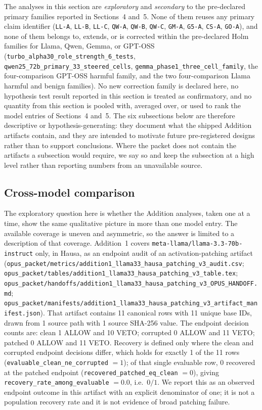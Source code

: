 The analyses in this section are \emph{exploratory} and \emph{secondary} to the
pre-declared primary families reported in Sections~4 and~5. None of them reuses
any primary claim identifier (\texttt{LL-A}, \texttt{LL-B}, \texttt{LL-C},
\texttt{QW-A}, \texttt{QW-B}, \texttt{QW-C}, \texttt{GM-A}, \texttt{G5-A},
\texttt{CS-A}, \texttt{GO-A}), and none of them belongs to, extends, or is
corrected within the pre-declared Holm families for Llama, Qwen, Gemma, or
GPT-OSS (\texttt{turbo\_alpha30\_role\_strength\_6\_tests},
\texttt{qwen25\_72b\_primary\_33\_steered\_cells},
\texttt{gemma\_phase1\_three\_cell\_family}, the four-comparison GPT-OSS harmful
family, and the two four-comparison Llama harmful and benign families). No new
correction family is declared here, no hypothesis test result reported in this
section is treated as confirmatory, and no quantity from this section is pooled
with, averaged over, or used to rank the model entries of Sections~4 and~5. The
six subsections below are therefore descriptive or hypothesis-generating: they
document what the shipped Addition artifacts contain, and they are intended to
motivate future pre-registered designs rather than to support conclusions.
Where the packet does not contain the artifacts a subsection would require, we
say so and keep the subsection at a high level rather than reporting numbers
from an unavailable source.

\subsection{Cross-model comparison}

The exploratory question here is whether the Addition analyses, taken one at a
time, show the same qualitative picture in more than one model entry. The
available coverage is uneven and asymmetric, so the answer is limited to a
description of that coverage. Addition~1 covers
\texttt{meta-llama/llama-3.3-70b-instruct} only, in Hausa, as an endpoint audit
of an activation-patching artifact
(\texttt{opus\_packet/metrics/addition1\_llama33\_hausa\_patching\_v3\_audit.csv};
\texttt{opus\_packet/tables/addition1\_llama33\_hausa\_patching\_v3\_table.tex};
\texttt{opus\_packet/handoffs/addition1\_llama33\_hausa\_patching\_v3\_OPUS\_HANDOFF.md};
\texttt{opus\_packet/manifests/addition1\_llama33\_hausa\_patching\_v3\_artifact\_manifest.json}).
That artifact contains 11 canonical rows with 11 unique base IDs, drawn from 1
source path with 1 source SHA-256 value. The endpoint decision counts are: clean
1 ALLOW and 10 VETO; corrupted 0 ALLOW and 11 VETO; patched 0 ALLOW and 11
VETO. Recovery is defined only where the clean and corrupted endpoint decisions
differ, which holds for exactly 1 of the 11 rows
(\texttt{evaluable\_clean\_ne\_corrupted} $=1$); of that single evaluable row, 0
recovered at the patched endpoint (\texttt{recovered\_patched\_eq\_clean} $=0$),
giving \texttt{recovery\_rate\_among\_evaluable} $=0.0$, i.e.\ $0/1$. We report
this as an observed endpoint outcome in this artifact with an explicit
denominator of one; it is not a population recovery rate and it is not evidence
of broad patching failure.

